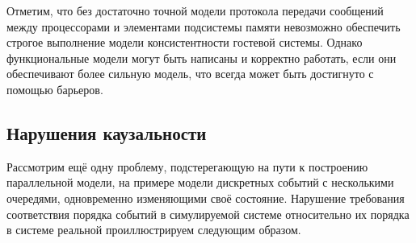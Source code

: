 Отметим, что без достаточно точной модели протокола передачи сообщений между процессорами и элементами подсистемы памяти невозможно обеспечить строгое выполнение модели консистентности гостевой системы. Однако функциональные модели могут быть написаны и корректно работать, если они обеспечивают более сильную модель, что всегда может быть достигнуто с помощью барьеров.

\subsection[Нарушения каузальности]{Нарушения каузальности}

Рассмотрим ещё одну проблему, подстерегающую на пути к построению параллельной модели, на примере модели дискретных событий с несколькими очередями, одновременно изменяющими своё состояние. Нарушение требования соответствия порядка событий в симулируемой системе относительно их порядка в системе реальной проиллюстрируем следующим образом.

% 
%     
%     
%     
%     
%     
%     
%     
%     

